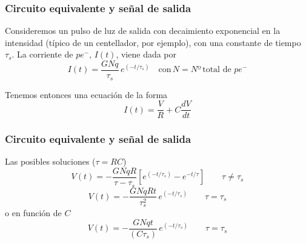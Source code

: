 \documentclass{beamer}
\begin{document}
\begin{frame}
\frametitle{Circuito equivalente y señal de salida}
\begin{block}{}
Consideremos un pulso de luz de salida con decaimiento exponencial en la
intensidad (típico de un centellador, por ejemplo), con una constante
de tiempo $\tau_s$. La corriente de $pe^-$, $I(t)$, viene dada por
$$I(t) = \frac{GNq}{\tau_s}\, e^{(-t/\tau_s)} \quad \text{con}\,N = Nº\,\text{
total de}\,\, pe^- $$

Tenemos entonces una ecuación de la forma 
$$I(t) = \frac{V}{R} + C \frac{dV}{dt}$$

\end{block}
\end{frame} 

\begin{frame}
\frametitle{Circuito equivalente y señal de salida}
\begin{block}{}
Las posibles soluciones ($\tau = RC$)
$$V(t) = - \frac{GNqR}{\tau - \tau_s}\left[e^{(-t/\tau_s)} -
e^{-t/\tau}\right]\qquad \tau \neq \tau_s$$
$$V(t) = - \frac{GNqRt}{\tau_s^2}\,e^{(-t/\tau_s)} \qquad \tau = \tau_s$$
o en función de $C$
$$V(t) = - \frac{GNqt}{(C \tau_s)}\, e^{(-t/\tau_s)} \qquad \tau = \tau_s$$
\end{block}
\end{frame} 
\end{document}
